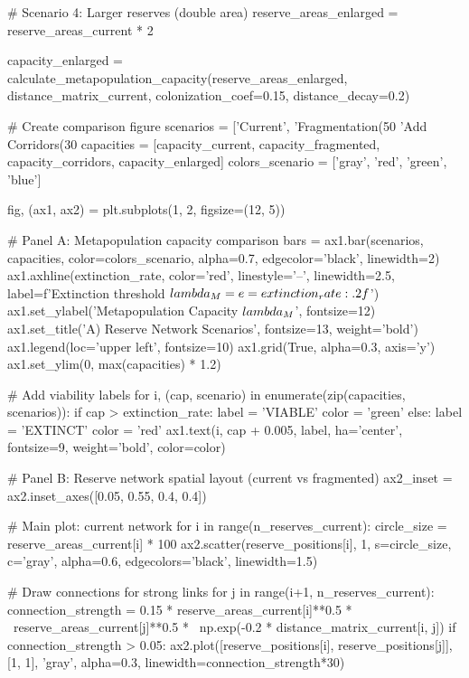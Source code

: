 \documentclass[11pt,a4paper]{article}
\begin{document}
\begin{pycode}
# Scenario 4: Larger reserves (double area)
reserve_areas_enlarged = reserve_areas_current * 2

capacity_enlarged = calculate_metapopulation_capacity(reserve_areas_enlarged,
                                                     distance_matrix_current,
                                                     colonization_coef=0.15, distance_decay=0.2)

# Create comparison figure
scenarios = ['Current\nNetwork', 'Fragmentation\n(50%
            'Add Corridors\n(30%
capacities = [capacity_current, capacity_fragmented, capacity_corridors, capacity_enlarged]
colors_scenario = ['gray', 'red', 'green', 'blue']

fig, (ax1, ax2) = plt.subplots(1, 2, figsize=(12, 5))

# Panel A: Metapopulation capacity comparison
bars = ax1.bar(scenarios, capacities, color=colors_scenario, alpha=0.7, edgecolor='black', linewidth=2)
ax1.axhline(extinction_rate, color='red', linestyle='--', linewidth=2.5,
           label=f'Extinction threshold $\\lambda_M = e = {extinction_rate:.2f}$')
ax1.set_ylabel('Metapopulation Capacity $\\lambda_M$', fontsize=12)
ax1.set_title('A) Reserve Network Scenarios', fontsize=13, weight='bold')
ax1.legend(loc='upper left', fontsize=10)
ax1.grid(True, alpha=0.3, axis='y')
ax1.set_ylim(0, max(capacities) * 1.2)

# Add viability labels
for i, (cap, scenario) in enumerate(zip(capacities, scenarios)):
    if cap > extinction_rate:
        label = 'VIABLE'
        color = 'green'
    else:
        label = 'EXTINCT'
        color = 'red'
    ax1.text(i, cap + 0.005, label, ha='center', fontsize=9, weight='bold', color=color)

# Panel B: Reserve network spatial layout (current vs fragmented)
ax2_inset = ax2.inset_axes([0.05, 0.55, 0.4, 0.4])

# Main plot: current network
for i in range(n_reserves_current):
    circle_size = reserve_areas_current[i] * 100
    ax2.scatter(reserve_positions[i], 1, s=circle_size, c='gray', alpha=0.6,
               edgecolors='black', linewidth=1.5)

    # Draw connections for strong links
    for j in range(i+1, n_reserves_current):
        connection_strength = 0.15 * reserve_areas_current[i]**0.5 * \
                            reserve_areas_current[j]**0.5 * \
                            np.exp(-0.2 * distance_matrix_current[i, j])
        if connection_strength > 0.05:
            ax2.plot([reserve_positions[i], reserve_positions[j]], [1, 1],
                    'gray', alpha=0.3, linewidth=connection_strength*30)


\end{pycode}
\end{document}
